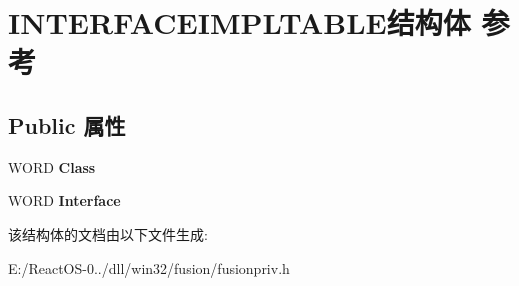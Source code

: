 \hypertarget{struct_i_n_t_e_r_f_a_c_e_i_m_p_l_t_a_b_l_e}{}\section{I\+N\+T\+E\+R\+F\+A\+C\+E\+I\+M\+P\+L\+T\+A\+B\+L\+E结构体 参考}
\label{struct_i_n_t_e_r_f_a_c_e_i_m_p_l_t_a_b_l_e}
\subsection*{Public 属性}
\begin{DoxyCompactItemize}
\item 
\mbox{\label{struct_i_n_t_e_r_f_a_c_e_i_m_p_l_t_a_b_l_e_a97330939b1438a10c3fac0ac68c350d6}} 
W\+O\+RD {\bfseries Class}
\item 
\mbox{\label{struct_i_n_t_e_r_f_a_c_e_i_m_p_l_t_a_b_l_e_a4852b2fc17e007a85cfb8b86c0390e56}} 
W\+O\+RD {\bfseries Interface}
\end{DoxyCompactItemize}


该结构体的文档由以下文件生成\+:\begin{DoxyCompactItemize}
\item 
E\+:/\+React\+O\+S-\/0../dll/win32/fusion/fusionpriv.\+h\end{DoxyCompactItemize}
